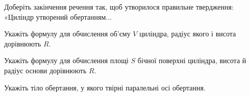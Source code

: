 \documentclass[12pt]{article}
\begin{document}
\begin{samepage}
\noindent\zadnum Доберіть закінчення речення так, щоб утворилося правильне твердження: «Циліндр утворений обертанням... 

\nmtnobreak
\nopagebreak\nbvspace{0.3cm}
\noindent
{}


\nmtnobreak
\nopagebreak\nbvspace{0.5cm}
\par{}\vspace{0.25cm}
\end{samepage}

\begin{samepage}
\noindent\zadnum Укажіть формулу для обчислення об’єму $V$ циліндра, радіус якого і висота дорівнюють $R$. 

\nmtnobreak
\nopagebreak\nbvspace{0.3cm}
\par{}
\end{samepage}

\begin{samepage}
\noindent\zadnum Укажіть формулу для обчислення площі $S$ бічної поверхні циліндра, висота й радіус основи дорівнюють $R$. 

\nmtnobreak
\nopagebreak\nbvspace{0.3cm}
\par{}
\end{samepage}

\begin{samepage}
\noindent\zadnum Укажіть тіло обертання, у якого твірні паралельні осі обертання. 

\nmtnobreak
\nopagebreak\nbvspace{0.3cm}
\par{}
\end{samepage}
\end{document}
